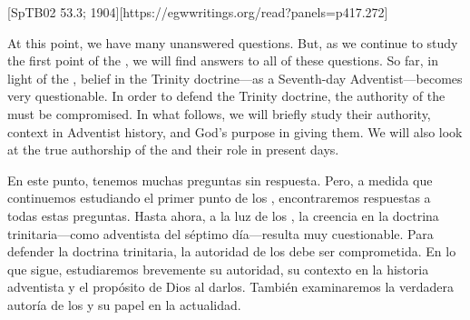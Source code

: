 [SpTB02 53.3; 1904][https://egwwritings.org/read?panels=p417.272]


At this point, we have many unanswered questions. But, as we continue to study the first point of the , we will find answers to all of these questions. So far, in light of the , belief in the Trinity doctrine—as a Seventh-day Adventist—becomes very questionable. In order to defend the Trinity doctrine, the authority of the  must be compromised. In what follows, we will briefly study their authority, context in Adventist history, and God’s purpose in giving them. We will also look at the true authorship of the  and their role in present days.


En este punto, tenemos muchas preguntas sin respuesta. Pero, a medida que continuemos estudiando el primer punto de los , encontraremos respuestas a todas estas preguntas. Hasta ahora, a la luz de los , la creencia en la doctrina trinitaria—como adventista del séptimo día—resulta muy cuestionable. Para defender la doctrina trinitaria, la autoridad de los  debe ser comprometida. En lo que sigue, estudiaremos brevemente su autoridad, su contexto en la historia adventista y el propósito de Dios al darlos. También examinaremos la verdadera autoría de los  y su papel en la actualidad.






